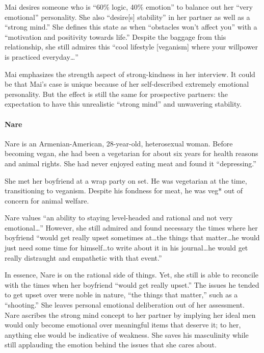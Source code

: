 \documentclass[twoside]{report}
\begin{document}
Mai desires someone who is ``60\% logic, 40\% emotion'' to balance out her ``very emotional'' personality. She also ``desire{[}s{]} stability'' in her partner as well as a ``strong mind.'' She defines this state as when ``obstacles won't affect you'' with a ``motivation and positivity towards life.'' Despite the baggage from this relationship, she still admires this ``cool lifestyle {[}veganism{]} where your willpower is practiced everyday\ldots''

Mai emphasizes the strength aspect of strong-kindness in her interview. It could be that Mai's case is unique because of her self-described extremely emotional personality. But the effect is still the same for prospective partners: the expectation to have this unrealistic ``strong mind'' and unwavering stability.

\paragraph{Nare}

Nare is an Armenian-American, 28-year-old, heterosexual woman. Before becoming vegan, she had been a vegetarian for about six years for health reasons and animal rights. She had never enjoyed eating meat and found it ``depressing.''

She met her boyfriend at a wrap party on set. He was vegetarian at the time, transitioning to veganism. Despite his fondness for meat, he was veg* out of concern for animal welfare.

Nare values ``an ability to staying level-headed and rational and not very emotional\ldots'' However, she still admired and found necessary the times where her boyfriend ``would get really upset sometimes at\dots the things that matter\dots he would just need some time for himself\dots to write about it in his journal\dots he would get really distraught and empathetic with that event.''

In essence, Nare is on the rational side of things. Yet, she still is able to reconcile with the times when her boyfriend ``would get really upset.'' The issues he tended to get upset over were noble in nature, ``the things that matter,'' such as a ``shooting.'' She leaves personal emotional deliberation out of her assessment. Nare ascribes the strong mind concept to her partner by implying her ideal men would only become emotional over meaningful items that deserve it; to her, anything else would be indicative of weakness. She saves his masculinity while still applauding the emotion behind the issues that she cares about.
\end{document}

